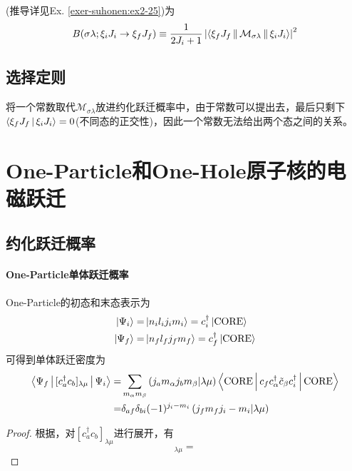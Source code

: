(推导详见Ex. \ref{exer-suhonen:ex2-25})为
\begin{equation}
    B(\sigma\lambda; \xi_i J_i \rightarrow \xi_f J_f) \equiv \frac{1}{2J_i + 1} \left|\Braket{\xi_f J_f || \mathcal{M}_{\sigma\lambda} || \xi_i J_i}\right|^2
    \label{eq:reduced-TransProb}
\end{equation}



\subsection{选择定则}
\begin{question}[一个常数无法连接两个不同的原子核态。]
    将一个常数取代$\mathcal{M}_{\sigma\lambda}$放进约化跃迁概率中，由于常数可以提出去，最后只剩下$\Braket{\xi_f J_f |\xi_i J_i} = 0$(不同态的正交性)，因此一个常数无法给出两个态之间的关系。
\end{question}


\section{One-Particle和One-Hole原子核的电磁跃迁}

\subsection{约化跃迁概率}
\paragraph*{One-Particle单体跃迁概率}
One-Particle的初态和末态表示为
\begin{align}
    \ket{\Psi_i} =& \ket{n_i l_i j_i m_i} = c_{i}^{\dagger} \ket{\rm{CORE}} \\
    \ket{\Psi_f} =& \ket{n_f l_f j_f m_f} = c_{f}^{\dagger} \ket{\rm{CORE}}
\end{align}
可得到单体跃迁密度为
\begin{equation}
    \begin{aligned}
    \Braket{\Psi_f | [c_a^{\dagger} c_b]_{\lambda\mu} | \Psi_i}
    =&
    \sum_{m_\alpha m_\beta} \left(j_a m_\alpha j_b m_\beta | \lambda \mu\right)
    \Braket{\rm{CORE} | c_f c_\alpha^\dagger \tilde{c}_\beta c_i^\dagger | \rm{CORE}} \\
    =& \delta_{af}\delta_{bi} (-1)^{j_i - m_i} \left(j_f m_f j_i -m_i | \lambda \mu\right)        
    \end{aligned}
\end{equation}
\begin{proof}
    根据，对$[c_a^{\dagger} c_b]_{\lambda\mu}$进行展开，有
    \begin{equation}
        [c_a^{\dagger} c_b]_{\lambda\mu} = 
    \end{equation}
\end{proof}
